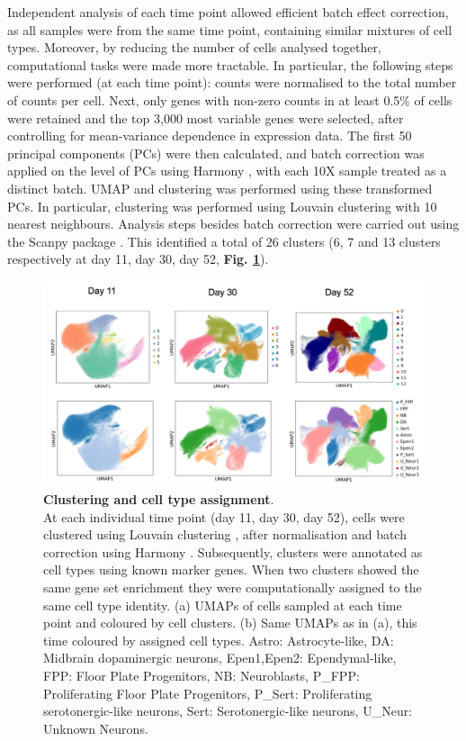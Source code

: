 Independent analysis of each time point allowed efficient batch effect correction, as all samples were from the same time point, containing similar mixtures of cell types.
Moreover, by reducing the number of cells analysed together, computational tasks were made more tractable.
In particular, the following steps were performed (at each time point): counts were normalised to the total number of counts per cell. 
Next, only genes with non-zero counts in at least 0.5\% of cells were retained and the top 3,000 most variable genes were selected, after controlling for mean-variance dependence in expression data. 
The first 50 principal components (PCs) were then calculated, and
batch correction was applied on the level of PCs using Harmony \cite{korsunsky2019fast}, with each 10X sample treated as a distinct batch. 
UMAP and clustering was performed using these transformed PCs. 
In particular, clustering was performed using Louvain clustering \cite{blondel2008fast} with 10 nearest neighbours. 
Analysis steps besides batch correction were carried out using the Scanpy package \cite{wolf2018scanpy}. 
This identified a total of 26 clusters (6, 7 and 13 clusters respectively at day 11, day 30, day 52, \textbf{Fig. \ref{fig:neuroseq_clusters}}). \\

\begin{figure}[h]
\centering
\includegraphics[width=16cm]{Chapter5/Fig/neuroseq_clusters_celltypes.png}
\caption[Clustering and cell type assignment]{\textbf{Clustering and cell type assignment}.\\
At each individual time point (day 11, day 30, day 52), cells were clustered using Louvain clustering \cite{blondel2008fast}, after normalisation and batch correction using Harmony \cite{korsunsky2019fast}.
Subsequently, clusters were annotated as cell types using known marker genes. 
When two clusters showed the same gene set enrichment they were computationally assigned to the same cell type identity. 
(a) UMAPs of cells sampled at each time point and coloured by cell clusters. 
(b) Same UMAPs as in (a), this time coloured by assigned cell types.
Astro: Astrocyte-like, DA: Midbrain dopaminergic neurons, Epen1,Epen2: Ependymal-like, FPP: Floor Plate Progenitors, NB: Neuroblasts, P\_FPP: Proliferating Floor Plate Progenitors, P\_Sert: Proliferating serotonergic-like neurons, Sert: Serotonergic-like neurons, U\_Neur: Unknown Neurons.}
\label{fig:neuroseq_clusters}
\end{figure}

